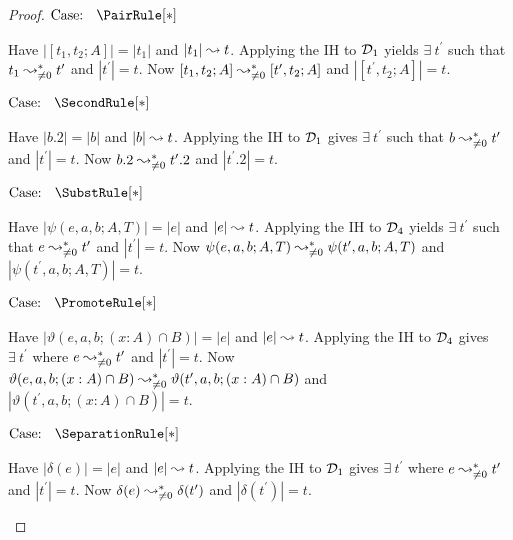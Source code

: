 \begin{proof}
    $\text{Case: }\begin{array}{c} \PairRule[*] \end{array}$
    \begin{proofcase}
        Have $|[t_1, t_2; A]| = |t_1|$ and $|t_1| \leadsto t$.
        Applying the IH to $\mathcal{D}_{1}$ yields $\exists\ t^\prime$ such that $t_1 \leadsto^*_{\neq 0} t^\prime$ and $|t^\prime| = t$.
        Now $[t_1, t_2; A] \leadsto^*_{\neq 0} [t^\prime, t_2; A]$ and $|[t^\prime, t_2; A]| = t$.
    \end{proofcase}

    $\text{Case: }\begin{array}{c} \SecondRule[*] \end{array}$
    \begin{proofcase}
        Have $|b.2| = |b|$ and $|b| \leadsto t$.
        Applying the IH to $\mathcal{D}_{1}$ gives $\exists\ t^\prime$ such that $b \leadsto^*_{\neq 0} t^\prime$ and $|t^\prime| = t$.
        Now $b.2 \leadsto^*_{\neq 0} t^\prime.2$ and $|t^\prime.2| = t$.
    \end{proofcase}

    $\text{Case: }\begin{array}{c} \SubstRule[*] \end{array}$
    \begin{proofcase}
        Have $|\psi(e, a, b; A, T)| = |e|$ and $|e| \leadsto t$.
        Applying the IH to $\mathcal{D}_{4}$ yields $\exists\ t^\prime$ such that $e \leadsto^*_{\neq 0} t^\prime$ and $|t^\prime| = t$.
        Now $\psi(e, a, b; A, T) \leadsto^*_{\neq 0} \psi(t^\prime, a, b; A, T)$
            and $|\psi(t^\prime, a, b; A, T)| = t$.
    \end{proofcase}

    $\text{Case: }\begin{array}{c} \PromoteRule[*] \end{array}$
    \begin{proofcase}
        Have $|\vartheta(e, a, b; (x : A) \cap B)| = |e|$ and $|e| \leadsto t$.
        Applying the IH to $\mathcal{D}_{4}$ gives $\exists\ t^\prime$ where $e \leadsto^*_{\neq 0} t^\prime$ and $|t^\prime| = t$.
        Now $\vartheta(e, a, b; (x : A) \cap B) \leadsto^*_{\neq 0} \vartheta(t^\prime, a, b; (x : A) \cap B)$
            and $|\vartheta(t^\prime, a, b; (x : A) \cap B)| = t$.
    \end{proofcase}

    $\text{Case: }\begin{array}{c} \SeparationRule[*] \end{array}$
    \begin{proofcase}
        Have $|\delta(e)| = |e|$ and $|e| \leadsto t$.
        Applying the IH to $\mathcal{D}_{1}$ gives $\exists\ t^\prime$ where $e \leadsto^*_{\neq 0} t^\prime$ and $|t^\prime| = t$.
        Now $\delta(e) \leadsto^*_{\neq 0} \delta(t^\prime)$ and $|\delta(t^\prime)| = t$.
    \end{proofcase}


\end{proof}
